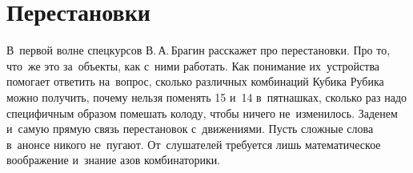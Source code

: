 
\section*{Перестановки}



В~первой волне спецкурсов В.\,А.\,Брагин расскажет про перестановки.
Про то, что~же это за~объекты, как с~ними работать.
Как понимание их~устройства помогает ответить на~вопрос, сколько различных
комбинаций Кубика Рубика можно получить, почему нельзя поменять 15 и~14
в~пятнашках, сколько раз надо специфичным образом помешать  колоду, чтобы
ничего не~изменилось.
Заденем и~самую прямую связь перестановок с~движениями.
Пусть сложные слова в~анонсе никого не~пугают.
От~слушателей требуется лишь математическое воображение и~знание азов
комбинаторики.

\bigskip


\begin{center}
\quad
{}
\end{center}

